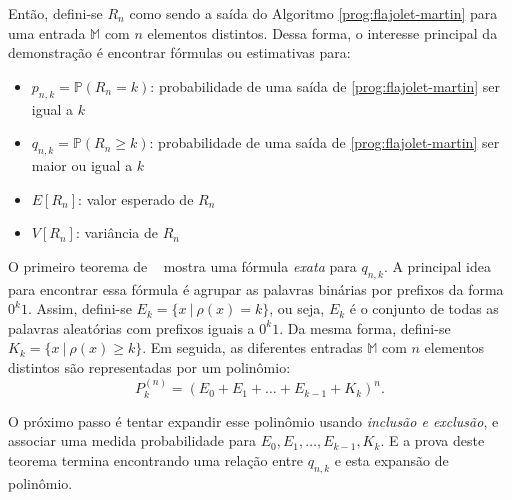 Então, defini-se $R_n$ como sendo a saída do Algoritmo \ref{prog:flajolet-martin} para uma entrada $\mathbb{M}$
com $n$ elementos distintos. Dessa forma, o interesse principal da demonstração é encontrar fórmulas ou estimativas
para:
\begin{itemize}
  \item $p_{n,k} = \mathbb{P}(R_n = k)$: probabilidade de uma saída de \ref{prog:flajolet-martin} ser igual a $k$
  \item $q_{n,k} = \mathbb{P}(R_n \geq k)$: probabilidade de uma saída de \ref{prog:flajolet-martin} 
  ser maior ou igual a $k$
  \item $E[R_n]$: valor esperado de $R_n$
  \item $V[R_n]$: variância de $R_n$
\end{itemize}

O primeiro teorema de ~\citep{flajolet:martin:85} mostra uma fórmula \textit{exata} para $q_{n,k}$. 
A principal idea para encontrar essa fórmula é agrupar as palavras binárias por prefixos da forma $0^k1$.
Assim, defini-se $E_k = \{ x  \ | \ \rho(x) = k \}$, ou seja, $E_k$ é o conjunto de todas as palavras aleatórias com prefixos
iguais a $0^k1$. Da mesma forma, defini-se $K_k = \{ x \ | \ \rho(x) \geq k \}$. Em seguida, as diferentes entradas $\mathbb{M}$
com $n$ elementos distintos são representadas por um polinômio:
\[ P_k^{(n)} = (E_0 + E_1 + \dots + E_{k-1} + K_k)^n .\]

O próximo passo é tentar expandir esse polinômio usando \textit{inclusão e exclusão}, 
e associar uma medida probabilidade para $E_0, E_1, \dots, E_{k-1}, K_k$. E a prova deste teorema termina encontrando uma relação entre $q_{n,k}$
e esta expansão de polinômio.